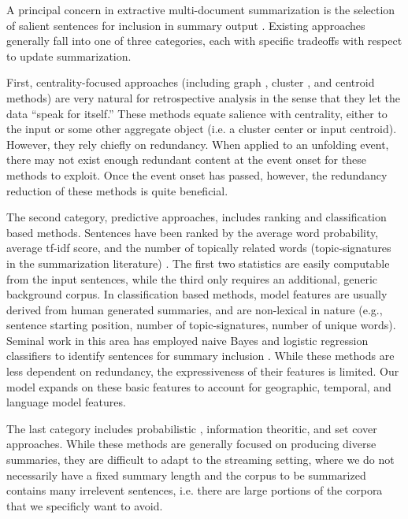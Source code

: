 \label{sec:relatedwork}

A principal concern in extractive multi-document summarization is the
selection of salient sentences for inclusion in summary output
\cite{nenkova2012survey}. 
Existing approaches generally fall into  %
one of three categories, each with specific tradeoffs with respect to update 
summarization. 

First, centrality-focused approaches (including graph \cite{erkan2004lexrank},
cluster \cite{hatzivassiloglou2001simfinder}, and centroid \cite{radev2004centroid} methods) are very natural for retrospective analysis in
the sense that they let the data ``speak for itself.'' 
These methods equate salience with centrality, either to the input or some other
aggregate object (i.e. a cluster center or input centroid).
However, they rely
chiefly on
redundancy. When applied to an unfolding event, there may not exist enough
redundant content at the event onset for these methods to exploit.
Once the event onset has passed, however, the redundancy reduction of these 
methods is quite beneficial.

The second category, predictive approaches,
includes ranking and classification based methods.
Sentences have been ranked by the average word probability, average tf-idf
score, and the number of topically related words (topic-signatures in the
summarization literature)
\cite{nenkova2005impact,hovy1998automated,lin2000automated}. The first two
statistics are easily computable from the input sentences, while the third
only requires an additional, generic background corpus.  
In classification based methods, model features are
usually derived from human generated summaries, and are non-lexical in nature
(e.g., sentence starting position, number of topic-signatures, number of
unique words). Seminal work in this area has employed naive
Bayes and logistic regression classifiers to identify sentences for summary
inclusion \cite{kupiec1995trainable,conroy2001using}. 
While these methods are less dependent on redundancy, the expressiveness of
their features is limited. Our model expands on these basic features to 
account for geographic, temporal, and language model features.

The last category includes probabilistic \cite{haghighi2009exploring}, 
information theoritic, and set cover \cite{lin2011class}
approaches. While these methods are generally focused on producing diverse
summaries, they are difficult to adapt to the streaming setting, where 
we do not necessarily have a fixed summary length and the corpus to be
summarized contains many irrelevent sentences, i.e. there are large
portions of the corpora that we specificly want to avoid. 




